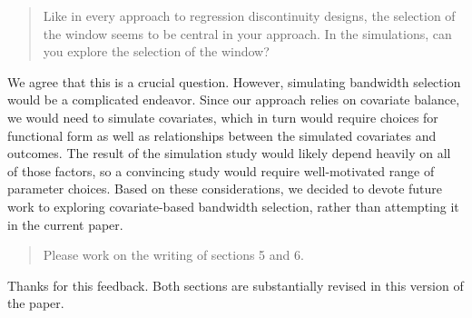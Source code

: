 \documentclass[12pt]{article}
\begin{document}
\begin{quote}
Like in every approach to regression discontinuity designs, the
selection of the window seems to be central in your approach. In the
simulations, can you explore the selection of the window?
\end{quote}
We agree that this is a crucial question. However, simulating bandwidth
selection would be a complicated endeavor. Since our approach relies on
covariate balance, we would need to simulate covariates, which in turn
would require choices for functional form as well as relationships
between the simulated covariates and outcomes. The result of the
simulation study would likely depend heavily on all of those factors, so a
convincing study would require well-motivated range of parameter
choices. Based on these considerations, we decided to devote future
work to exploring covariate-based bandwidth selection, rather than
attempting it in the current paper.

\begin{quote}
Please work on the writing of sections 5 and 6.
\end{quote}
Thanks for this feedback. Both sections are substantially
revised in this version of the paper.
\end{document}
